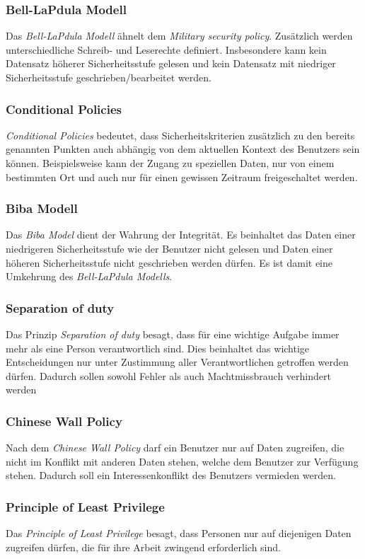 \subsubsection{Bell-LaPdula Modell}
Das \textit{Bell-LaPdula Modell} ähnelt dem \textit{Military security policy}. Zusätzlich werden unterschiedliche Schreib- und Leserechte definiert. Insbesondere kann kein Datensatz höherer Sicherheitsstufe gelesen und kein Datensatz mit niedriger Sicherheitsstufe geschrieben/bearbeitet werden.
\subsubsection{Conditional Policies}
\textit{Conditional Policies} bedeutet, dass Sicherheitskriterien zusätzlich zu den bereits genannten Punkten auch abhängig von dem aktuellen Kontext des Benutzers sein können. Beispielsweise kann der Zugang zu speziellen Daten, nur von einem bestimmten Ort und auch nur für einen gewissen Zeitraum freigeschaltet werden.
\subsubsection{Biba Modell}
Das \textit{Biba Model} dient der Wahrung der Integrität. Es beinhaltet das Daten einer niedrigeren Sicherheitsstufe wie der Benutzer nicht gelesen und Daten einer höheren Sicherheitsstufe nicht geschrieben werden dürfen. Es ist damit eine Umkehrung des \textit{Bell-LaPdula Modells}.
\subsubsection{Separation of duty}
Das Prinzip \textit{Separation of duty} besagt, dass für eine wichtige Aufgabe immer mehr als eine Person verantwortlich sind. Dies beinhaltet das wichtige Entscheidungen nur unter Zustimmung aller Verantwortlichen getroffen werden dürfen. Dadurch sollen sowohl Fehler als auch Machtmissbrauch verhindert werden
\subsubsection{Chinese Wall Policy}
Nach dem \textit{Chinese Wall Policy} darf ein Benutzer nur auf Daten zugreifen, die nicht im Konflikt mit anderen Daten stehen, welche dem Benutzer zur Verfügung stehen. Dadurch soll ein Interessenkonflikt des Benutzers vermieden werden. 
\subsubsection{Principle of Least Privilege}
Das \textit{Principle of Least Privilege} besagt, dass Personen nur auf diejenigen Daten zugreifen dürfen, die für ihre Arbeit zwingend erforderlich sind.
